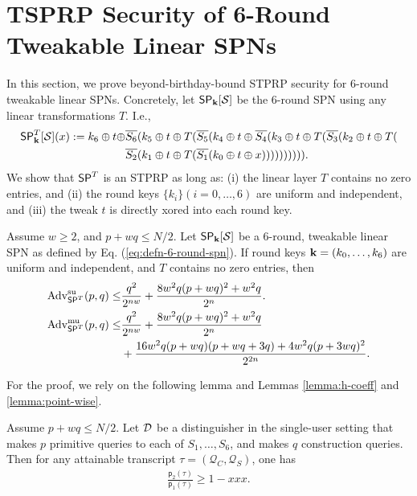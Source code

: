 

\section{TSPRP Security of 6-Round Tweakable Linear SPNs}
\label{section:beyond birthday bound for tweakable linear SPNs}

In this section, we prove beyond-birthday-bound STPRP security for 6-round tweakable linear SPNs. Concretely, let $\mathsf{SP}_{\mathbf{k}}[\mathcal{S}]$ be the 6-round SPN using any linear transformations $T$. I.e.,
%
\begin{align}
\mathsf{SP}_{\mathbf{k}}^T[\mathcal{S}](x):=k_6\oplus t\oplus&\overline{S_6}(k_5\oplus t\oplus  T(\overline{S_5}(k_4\oplus t\oplus\overline{S_4}(k_3\oplus t\oplus T(\overline{S_3}(k_2\oplus t\oplus T(    \notag    \\
&  \overline{S_2}(k_1\oplus t\oplus T(\overline{S_1}(k_0\oplus t\oplus x)))))))))).
\label{eq:defn-6-round-spn}
\end{align}
%
We show that $\mathsf{SP}^T$ is an STPRP as long as: (i) the linear layer $T$ contains no zero entries, and (ii) the round keys $\{k_i\}(i=0, \ldots , 6)$ are uniform and independent, and (iii) the tweak $t$ is directly xored into each round key.


\begin{theorem}
\label{theorem:6-rounds}

Assume $w\geq2$, and $p+wq\leq N/2$. Let $\mathsf{SP}_{\mathbf{k}}[\mathcal{S}]$ be a 6-round, tweakable linear SPN as defined by Eq. (\ref{eq:defn-6-round-spn}). If round keys $\mathbf{k}=(k_0,\ldots,k_6)$ are uniform and independent, and $T$ contains no zero entries, then
%
\begin{align}
\operatorname{Adv}_{\mathsf{SP}^T}^{\mathrm{su}}(p, q) \leq& \frac{q^2}{2^{n w}} + \frac{8 w^2 q(p+wq)^2+w^2 q}{2^n}   .  
\notag   \\
\operatorname{Adv}_{\mathsf{SP}^T}^{\mathrm{mu}}(p, q) \leq& \frac{q^2}{2^{n w}} + \frac{8 w^2 q(p+wq)^2+w^2 q}{2^n}    \notag   \\
&+ \frac{16 w^2 q(p+w q)(p+w q +3 q)+4 w^2 q(p+3 wq)^2}{2^{2 n}}.
\notag
\end{align}
\end{theorem}

For the proof, we rely on the following lemma and Lemmas \ref{lemma:h-coeff} and \ref{lemma:point-wise}.


\begin{lemma}
	\label{lemma:proximity-6-round}
	
	Assume $p+wq\leq N/2$. Let $\mathcal{D}$ be a distinguisher in the single-user setting that makes $p$ primitive queries to each of $S_1,\ldots,S_6$, and makes $q$ construction queries. Then for any attainable
	transcript $\tau=(\mathcal{Q}_C,\mathcal{Q}_S)$, one has
	\begin{align}
	\frac{\mathsf{p}_{2}(\tau)}{\mathsf{p}_{1}(\tau)}
	\geq 1 - xxx.
	\label{eq:bound-proximity-6-round}
	\end{align}
\end{lemma}



